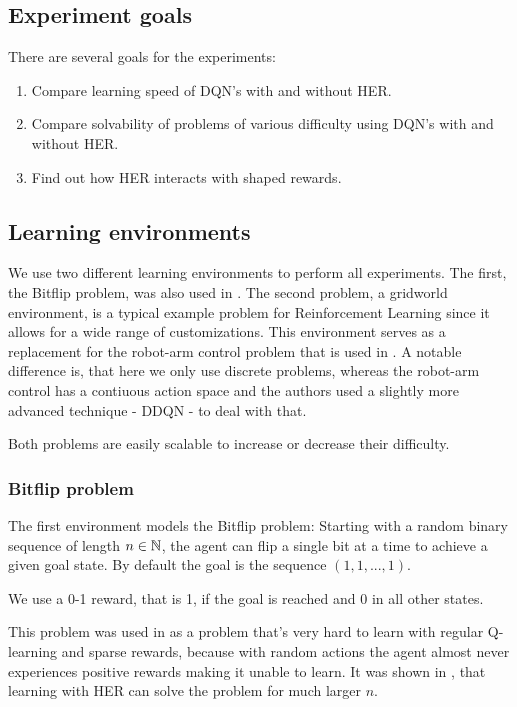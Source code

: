 \subsection{Experiment goals \label{section:goals}}
There are several goals for the experiments:
\begin{enumerate}
    \item Compare learning speed of DQN's with and without HER. \label{goals:learning_speed}
    \item Compare solvability of problems of various difficulty using DQN's with and without HER. \label{goals:solvability}
    \item Find out how HER interacts with shaped rewards. \label{goals:shaped_rewards}
\end{enumerate}
\subsection{Learning environments}
We use two different learning environments to perform all experiments.
The first, the Bitflip problem, was also used in \parencite{HERPaper}. The second problem, a gridworld environment, is a typical example problem for Reinforcement Learning since it allows for a wide range of customizations. This environment serves as a replacement for the robot-arm control problem that is used in \parencite{HERPaper}. A notable difference is, that here we only use discrete problems, whereas the robot-arm control has a contiuous action space and the authors used a slightly more advanced technique - DDQN - to deal with that.

Both problems are easily scalable to increase or decrease their difficulty.

\subsubsection{Bitflip problem}
The first environment models the Bitflip problem: Starting with a random binary sequence of length $n\in\mathbb{N}$, the agent can flip a single bit at a time to achieve a given goal state.
By default the goal is the sequence $(1,1,...,1)$.

We use a 0-1 reward, that is 1, if the goal is reached and 0 in all other states.

This problem was used in \parencite{HERPaper} as a problem that's very hard to learn with regular Q-learning and sparse rewards, because with random actions the agent almost never experiences positive rewards making it unable to learn.
It was shown in \parencite{HERPaper}, that learning with HER can solve the problem for much larger $n$.

